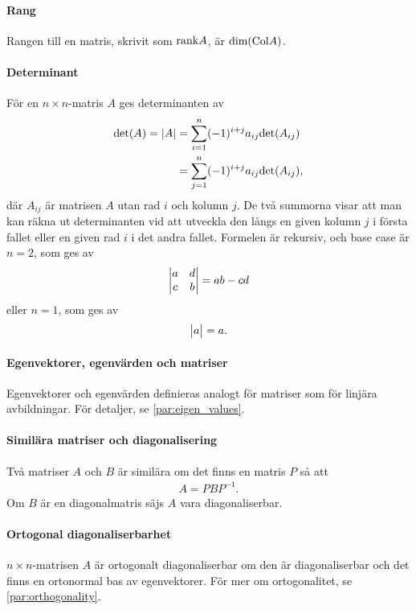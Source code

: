 \paragraph{Rang}
Rangen till en matris, skrivit som $\text{rank} A$, är $\text{dim}(\text{Col} A)$.

\paragraph{Determinant}
För en $n\times n$-matris $A$ ges determinanten av
\begin{align*}
	\text{det}(A) = \abs{A} &= \sum\limits_{i = 1}^{n}(-1)^{i + j}a_{ij}\text{det}(A_{ij}) \\
	&= \sum\limits_{j = 1}^{n}(-1)^{i + j}a_{ij}\text{det}(A_{ij}),
\end{align*}
där $A_{ij}$ är matrisen $A$ utan rad $i$ och kolumn $j$. De två summorna visar att man kan räkna ut determinanten vid att utveckla den långs en given kolumn $j$ i första fallet eller en given rad $i$ i det andra fallet. Formelen är rekursiv, och base case är $n=2$, som ges av
\begin{align*}
	\mdet{a & d \\ c & b} = ab - cd
\end{align*}
eller $n = 1$, som ges av
\begin{align*}
	\mdet{a} = a.
\end{align*}

\paragraph{Egenvektorer, egenvärden och matriser}
Egenvektorer och egenvärden definieras analogt för matriser som för linjära avbildningar. För detaljer, se \ref{par:eigen_values}.

\paragraph{Similära matriser och diagonalisering}
Två matriser $A$ och $B$ är similära om det finns en matris $P$ så att
\begin{align*}
	A = PBP^{-1}.
\end{align*}
Om $B$ är en diagonalmatris säjs $A$ vara diagonaliserbar.

\paragraph{Ortogonal diagonaliserbarhet}
$n\times n$-matrisen $A$ är ortogonalt diagonaliserbar om den är diagonaliserbar och det finns en ortonormal bas av egenvektorer. För mer om ortogonalitet, se \ref{par:orthogonality}.

